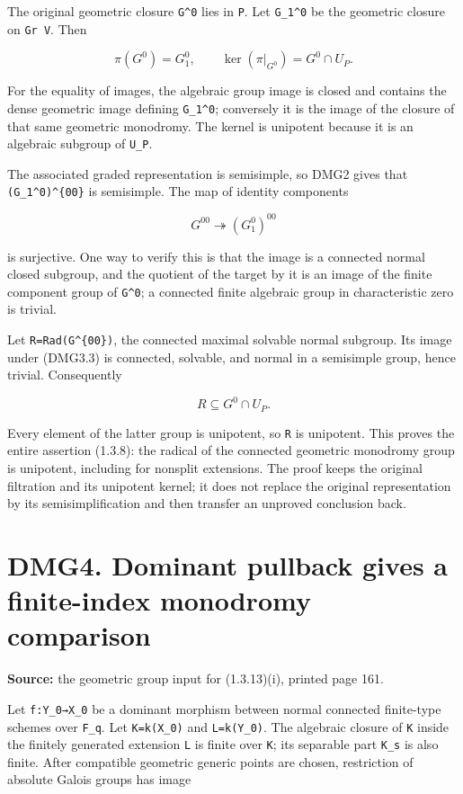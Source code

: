 \documentclass[
]{report}
\begin{document}
The original geometric closure \texttt{G\^{}0} lies in \texttt{P}. Let
\texttt{G\_1\^{}0} be the geometric closure on \texttt{Gr\ V}. Then

\[
\pi(G^0)=G_1^0,
\qquad
\ker(\pi|_{G^0})=G^0\cap U_P.
\tag{DMG3.2}
\]

For the equality of images, the algebraic group image is closed and
contains the dense geometric image defining \texttt{G\_1\^{}0};
conversely it is the image of the closure of that same geometric
monodromy. The kernel is unipotent because it is an algebraic subgroup
of \texttt{U\_P}.

The associated graded representation is semisimple, so DMG2 gives that
\texttt{(G\_1\^{}0)\^{}\{00\}} is semisimple. The map of identity
components

\[
G^{00}\twoheadrightarrow (G_1^0)^{00}
\tag{DMG3.3}
\]

is surjective. One way to verify this is that the image is a connected
normal closed subgroup, and the quotient of the target by it is an image
of the finite component group of \texttt{G\^{}0}; a connected finite
algebraic group in characteristic zero is trivial.

Let \texttt{R=Rad(G\^{}\{00\})}, the connected maximal solvable normal
subgroup. Its image under (DMG3.3) is connected, solvable, and normal in
a semisimple group, hence trivial. Consequently

\[
R\subseteq G^0\cap U_P.
\tag{DMG3.4}
\]

Every element of the latter group is unipotent, so \texttt{R} is
unipotent. This proves the entire assertion (1.3.8): the radical of the
connected geometric monodromy group is unipotent, including for nonsplit
extensions. The proof keeps the original filtration and its unipotent
kernel; it does not replace the original representation by its
semisimplification and then transfer an unproved conclusion back.

\section{DMG4. Dominant pullback gives a finite-index monodromy
comparison}\label{dmg4.-dominant-pullback-gives-a-finite-index-monodromy-comparison}

\textbf{Source:} the geometric group input for (1.3.13)(i), printed page
161.

Let \texttt{f:Y\_0→X\_0} be a dominant morphism between normal connected
finite-type schemes over \texttt{F\_q}. Let \texttt{K=k(X\_0)} and
\texttt{L=k(Y\_0)}. The algebraic closure of \texttt{K} inside the
finitely generated extension \texttt{L} is finite over \texttt{K}; its
separable part \texttt{K\_s} is also finite. After compatible geometric
generic points are chosen, restriction of absolute Galois groups has
image
\end{document}
